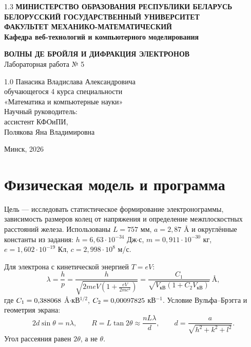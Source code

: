 \documentclass[12pt,a4paper]{article}
\begin{document}
\begin{titlepage}
\begin{center}
\begin{spacing}{1.3}
\textbf{МИНИСТЕРСТВО ОБРАЗОВАНИЯ РЕСПУБЛИКИ БЕЛАРУСЬ}\\[0.25cm]
\textbf{БЕЛОРУССКИЙ ГОСУДАРСТВЕННЫЙ УНИВЕРСИТЕТ}\\[0.25cm]
\textbf{ФАКУЛЬТЕТ МЕХАНИКО-МАТЕМАТИЧЕСКИЙ}\\[0.25cm]
\textbf{Кафедра веб-технологий и компьютерного моделирования}
\end{spacing}
\vspace{4.2cm}
\textbf{ВОЛНЫ ДЕ БРОЙЛЯ И ДИФРАКЦИЯ ЭЛЕКТРОНОВ}\\[0.4cm]
Лабораторная работа № 5
\end{center}
\vspace{3.6cm}
\noindent\hspace*{0.48\textwidth}\begin{minipage}{0.52\textwidth}
\begin{spacing}{1.0}
Панасика Владислава Александровича\\
обучающегося 4 курса специальности\\
«Математика и компьютерные науки»\\[0.6cm]
Научный руководитель:\\
ассистент КФОиПИ,\\
Полякова Яна Владимировна
\end{spacing}
\end{minipage}
\vfill
\begin{center}Минск, 2026\end{center}
\end{titlepage}
\setcounter{page}{2}
\tableofcontents
\clearpage

\section{Физическая модель и программа}
Цель --- исследовать статистическое формирование электронограммы,
зависимость размеров колец от напряжения и определение межплоскостных
расстояний железа. Использованы $L=757$ мм, $a=2{,}87$ \AA{} и округлённые
константы из задания: $h=6{,}63\cdot10^{-34}$ Дж$\cdot$с,
$m=0{,}911\cdot10^{-30}$ кг, $e=1{,}602\cdot10^{-19}$ Кл,
$c=2{,}998\cdot10^8$ м/с.

Для электрона с кинетической энергией $T=eV$:
\begin{equation}
 \lambda=\frac hp=
 \frac{h}{\sqrt{2meV\left(1+\frac{eV}{2mc^2}\right)}}
 =\frac{C_1}{\sqrt{V_{\mathrm{кВ}}(1+C_2V_{\mathrm{кВ}})}}\ \text{\AA},
\end{equation}
где $C_1=0{,}388068$ \AA$\cdot$кВ$^{1/2}$,
$C_2=0{,}00097825$ кВ$^{-1}$.
Условие Вульфа--Брэгга и геометрия экрана:
\begin{equation}
 2d\sin\theta=n\lambda,\qquad
 R=L\tan2\theta\approx\frac{nL\lambda}{d},\qquad
 d=\frac a{\sqrt{h^2+k^2+l^2}}.
\end{equation}
Угол рассеяния равен $2\theta$, а не $\theta$.
\end{document}
